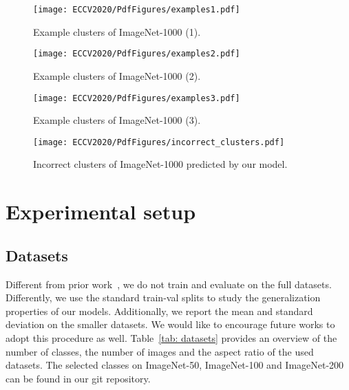\documentclass[runningheads]{llncs}
\begin{document}
\begin{figure}
\centering
\texttt{[image: ECCV2020/PdfFigures/examples1.pdf]}
\caption{Example clusters of ImageNet-1000 (1).}
\label{fig: clusters_imagenet1}
\end{figure}
\begin{figure}
\centering
\texttt{[image: ECCV2020/PdfFigures/examples2.pdf]}
\caption{Example clusters of ImageNet-1000 (2).}
\label{fig: clusters_imagenet2}
\end{figure}
\begin{figure}
\centering
\texttt{[image: ECCV2020/PdfFigures/examples3.pdf]}
\caption{Example clusters of ImageNet-1000 (3).}
\label{fig: clusters_imagenet3}
\end{figure}
\begin{figure}
\texttt{[image: ECCV2020/PdfFigures/incorrect\_clusters.pdf]}
\caption{Incorrect clusters of ImageNet-1000 predicted by our model.}
\label{fig: incorrect_clusters}
\end{figure}

 \section{Experimental setup}
\subsection{Datasets}
\label{subsec:datasets}
Different from prior work~\cite{IIC,DAC,DEC,yang2016joint}, we do not train and evaluate on the full datasets. Differently, we use the standard train-val splits to study the generalization properties of our models. Additionally, we report the mean and standard deviation on the smaller datasets. We would like to encourage future works to adopt this procedure as well. Table~\ref{tab: datasets} provides an overview of the number of classes, the number of images and the aspect ratio of the used datasets. The selected classes on ImageNet-50, ImageNet-100 and ImageNet-200 can be found in our git repository. 
\end{document}
